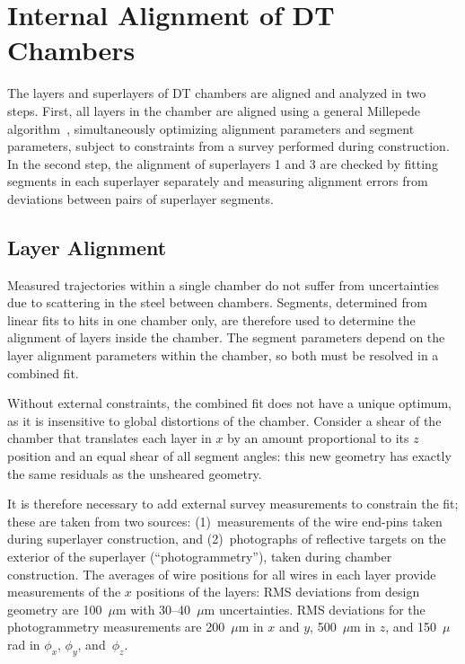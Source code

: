 \section{Internal Alignment of DT Chambers}
\label{sec:localdt}

The layers and superlayers of DT chambers are aligned and analyzed in
two steps.  First, all layers in the chamber are aligned using a general Millepede
algorithm~\cite{Blobel:2006yh}, simultaneously optimizing alignment
parameters and segment parameters, subject to constraints from a
survey performed during construction.  In the second step, the
alignment of superlayers 1 and 3 are checked by fitting
segments in each superlayer separately and measuring alignment
errors from deviations between pairs of superlayer segments.

\subsection{Layer Alignment}
\label{sec:localdt1}

Measured trajectories within a single chamber do not suffer
from uncertainties due to scattering in the steel between chambers.  Segments,
determined from linear fits to hits in one chamber only, are therefore used to
determine the alignment of layers inside the chamber.  The segment parameters
depend on the layer alignment parameters within the chamber, so
both must be resolved in a combined fit.

Without external constraints, the combined fit does not have a unique
optimum, as it is insensitive to global distortions of the chamber.
Consider a shear of the chamber that translates each layer in $x$ by
an amount proportional to its $z$ position and an equal shear of all
segment angles: this new geometry has exactly the same residuals as the
unsheared geometry.

It is therefore necessary to add external survey measurements to
constrain the fit; these are taken from two sources: (1)~measurements
of the wire end-pins taken during superlayer
construction, and (2)~photographs of reflective targets
on the exterior of the superlayer (``photogrammetry''), taken during
chamber construction.  The averages of wire positions for all wires in
each layer provide measurements of the $x$ positions of the layers:
RMS deviations from design geometry are 100~$\mu$m with 30--40~$\mu$m
uncertainties.  RMS deviations for the photogrammetry measurements
are 200~$\mu$m in $x$ and $y$, 500~$\mu$m in $z$, and 150~$\mu$rad in
$\phi_x$, $\phi_y$, and~$\phi_z$.

